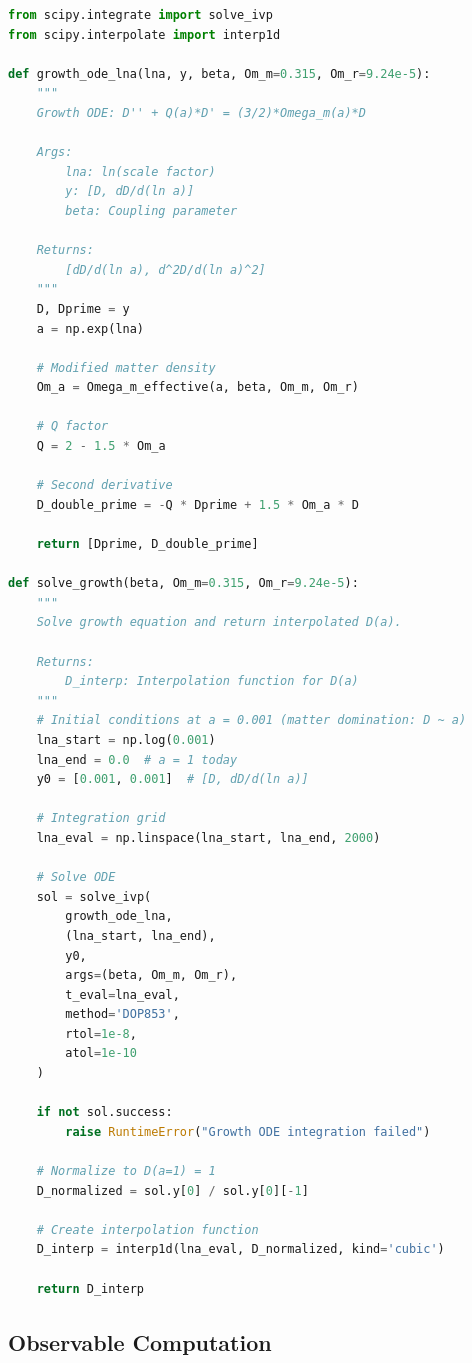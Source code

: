 \documentclass[11pt]{article}
\begin{document}
\begin{lstlisting}[language=Python]
from scipy.integrate import solve_ivp
from scipy.interpolate import interp1d

def growth_ode_lna(lna, y, beta, Om_m=0.315, Om_r=9.24e-5):
    """
    Growth ODE: D'' + Q(a)*D' = (3/2)*Omega_m(a)*D
    
    Args:
        lna: ln(scale factor)
        y: [D, dD/d(ln a)]
        beta: Coupling parameter
    
    Returns:
        [dD/d(ln a), d^2D/d(ln a)^2]
    """
    D, Dprime = y
    a = np.exp(lna)
    
    # Modified matter density
    Om_a = Omega_m_effective(a, beta, Om_m, Om_r)
    
    # Q factor
    Q = 2 - 1.5 * Om_a
    
    # Second derivative
    D_double_prime = -Q * Dprime + 1.5 * Om_a * D
    
    return [Dprime, D_double_prime]

def solve_growth(beta, Om_m=0.315, Om_r=9.24e-5):
    """
    Solve growth equation and return interpolated D(a).
    
    Returns:
        D_interp: Interpolation function for D(a)
    """
    # Initial conditions at a = 0.001 (matter domination: D ~ a)
    lna_start = np.log(0.001)
    lna_end = 0.0  # a = 1 today
    y0 = [0.001, 0.001]  # [D, dD/d(ln a)]
    
    # Integration grid
    lna_eval = np.linspace(lna_start, lna_end, 2000)
    
    # Solve ODE
    sol = solve_ivp(
        growth_ode_lna,
        (lna_start, lna_end),
        y0,
        args=(beta, Om_m, Om_r),
        t_eval=lna_eval,
        method='DOP853',
        rtol=1e-8,
        atol=1e-10
    )
    
    if not sol.success:
        raise RuntimeError("Growth ODE integration failed")
    
    # Normalize to D(a=1) = 1
    D_normalized = sol.y[0] / sol.y[0][-1]
    
    # Create interpolation function
    D_interp = interp1d(lna_eval, D_normalized, kind='cubic')
    
    return D_interp
\end{lstlisting}

\subsection{Observable Computation}
\end{document}
